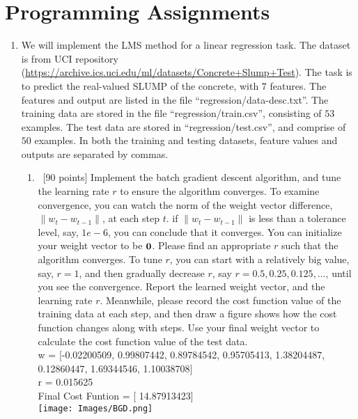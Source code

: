 \documentclass[12pt, fullpage,letterpaper]{article}
\begin{document}
\section{Programming Assignments}

\begin{enumerate}
\item We will implement the LMS method for a linear regression task. The dataset is from UCI repository (\url{https://archive.ics.uci.edu/ml/datasets/Concrete+Slump+Test}). The task is to predict the real-valued SLUMP of the concrete, with $7$ features. The features and output are listed in the file ``regression/data-desc.txt''. The training data are stored in the file ``regression/train.csv'', consisting of $53$ examples. The test data are stored in ``regression/test.csv'', and comprise of $50$ examples. In both the training and testing datasets, feature values and outputs are separated by commas.

\begin{enumerate}
\item~[90 points] Implement the batch gradient descent algorithm, and tune the learning rate $r$ to ensure the algorithm converges.  To examine convergence, you can watch the norm of the weight vector difference,  $\|w_{t} - w_{t-1}\|$,  at each step $t$.  if $\|w_{t} - w_{t-1}\|$ is  less than a tolerance level, say, $1e-6$, you can conclude that it converges. You can initialize your weight vector to be ${\bf 0}$.  Please find an appropriate $r$ such that the algorithm converges. To tune $r$, you can start with a relatively big value, say, $r=1$, and then gradually decrease $r$, say $r=0.5, 0.25, 0.125, \ldots$, until you see the convergence. 
Report the learned weight vector, and the learning rate $r$. Meanwhile, please record the cost function  value of the training data at each step, and then draw a figure shows how the cost function changes along with steps. Use your final weight vector to calculate  the cost function value of the test data.\\

w = [-0.02200509,  0.99807442,  0.89784542,  0.95705413,  1.38204487,  0.12860447, 1.69344546,  1.10038708]\\

r = 0.015625\\
Final Cost Funtion = [ 14.87913423]\\

\texttt{[image: Images/BGD.png]}


\end{enumerate}
\end{enumerate}
\end{document}
